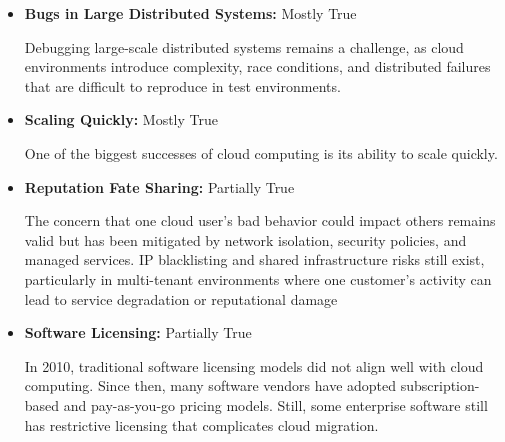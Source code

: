 \documentclass{article}
\begin{document}
\begin{itemize}
  \item \textbf{Bugs in Large Distributed Systems:}\newline
  Mostly True\newline

  Debugging large-scale distributed systems remains
  a challenge, as cloud environments introduce complexity,
  race conditions, and distributed failures that are difficult
  to reproduce in test environments.

  \item \textbf{Scaling Quickly:}\newline
  Mostly True\newline

  One of the biggest successes of cloud computing is its
  ability to scale quickly.

  \item \textbf{Reputation Fate Sharing:}\newline
  Partially True\newline

  The concern that one cloud user's bad behavior could
  impact others remains valid but has been mitigated
  by network isolation, security policies, and managed
  services. IP blacklisting and shared infrastructure
  risks still exist, particularly in multi-tenant
  environments where one customer's activity can lead
  to service degradation or reputational damage

  \item \textbf{Software Licensing:}\newline
  Partially True\newline

  In 2010, traditional software licensing models
  did not align well with cloud computing.
  Since then, many software vendors have adopted
  subscription-based and pay-as-you-go pricing models.
  Still, some enterprise software still has restrictive
  licensing that complicates cloud migration.
\end{itemize}


\newpage


\end{document}
